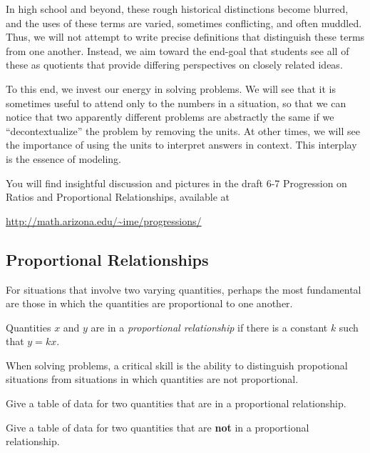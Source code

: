 In high school and beyond, these rough historical distinctions become blurred, and the uses of these terms are varied, sometimes conflicting, and often muddled.  Thus, we will not attempt to write precise definitions that distinguish these terms from one another.  Instead, we aim toward the end-goal that students see all of these as quotients that provide differing perspectives on closely related ideas.  

To this end, we invest our energy in solving problems.  We will see that it is sometimes useful to attend only to the numbers in a situation, so that we can notice that two apparently different problems are abstractly the same if we ``decontextualize'' the problem by removing the units.  At other times, we will see the importance of using the units to interpret answers in context.  This interplay is the essence of modeling.


\begin{teachingnote}
You will find insightful discussion and pictures in the draft 6-7 Progression on Ratios and Proportional Relationships, available at 

\url{http://math.arizona.edu/~ime/progressions/}
\end{teachingnote}

\subsection{Proportional Relationships}
For situations that involve two varying quantities, perhaps the most fundamental are those in which the quantities are proportional to one another.  
\begin{definition}
Quantities $x$ and $y$ are in a \emph{proportional relationship} if there is a constant $k$ such that $y=kx$.  
\end{definition}
When solving problems, a critical skill is the ability to distinguish propotional situations from situations in which quantities are not proportional.  
\begin{question}
Give a table of data for two quantities that are in a proportional relationship.  
\end{question}
\QM

\begin{question}
Give a table of data for two quantities that are \textbf{not} in a proportional relationship.  
\end{question}
\QM



